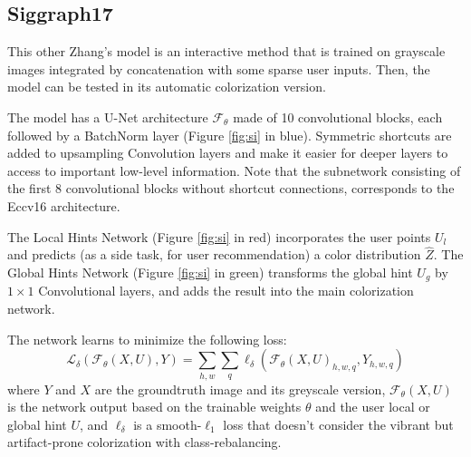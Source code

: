 \subsection{Siggraph17}

This other Zhang's model is an interactive method that is trained on grayscale images integrated by concatenation
with some sparse user inputs. Then, the model can be tested in its automatic colorization version.

The model has a U-Net architecture $\mathcal{F}_\theta$ made of 10 convolutional blocks, each followed by a BatchNorm layer (Figure \ref{fig:si} in blue).
Symmetric shortcuts are added to upsampling Convolution layers and make it easier for deeper layers to access to important low-level information. Note that the subnetwork consisting of the first 8
convolutional blocks without shortcut connections, corresponds to the Eccv16 architecture.

The Local Hints Network (Figure \ref{fig:si} in red) incorporates the user points $U_l$ and predicts (as a side task, for user recommendation) a color distribution $\hat{Z}$. The Global Hints Network (Figure \ref{fig:si} in green) transforms the global hint $U_g$ by $1\times1$ Convolutional layers, and adds the result into the main colorization network.

The network learns to minimize the following loss:
\begin{equation*}
	\mathcal{L}_\delta(\mathcal{F}_\theta(X, U), Y) = \sum_{h,w} \sum_{q} \ell_\delta (\mathcal{F}_\theta(X, U)_{h,w,q}, Y_{h,w,q})
\end{equation*}
where $Y$ and $X$ are the groundtruth image and its greyscale version, $\mathcal{F}_\theta(X, U)$ is the network output based on the trainable weights $\theta$ and the user local or global hint $U$, and $\ell_\delta$ is a smooth-$\ell_1$ loss that doesn't consider the vibrant but artifact-prone colorization with class-rebalancing.

